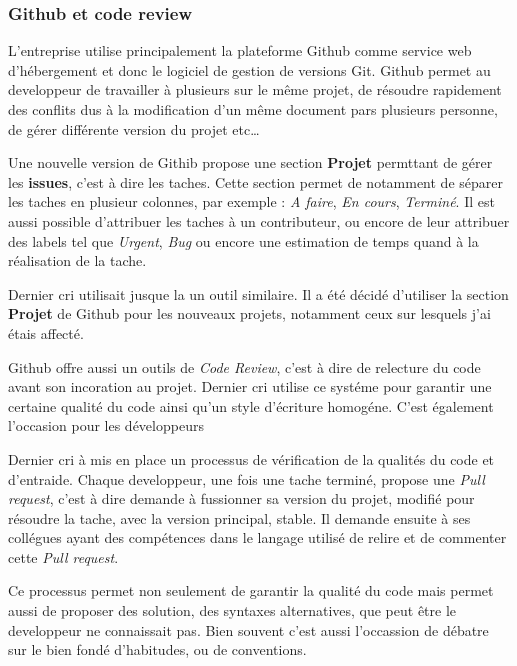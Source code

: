 \documentclass[12pt,a4paper]{article}
\begin{document}
  \subsubsection{Github et code review}\label{github-et-code-review}

  \bigskip

  L'entreprise utilise principalement la plateforme Github comme service
  web d'hébergement et donc le logiciel de gestion de versions Git. Github
  permet au developpeur de travailler à plusieurs sur le même projet, de
  résoudre rapidement des conflits dus à la modification d'un même
  document pars plusieurs personne, de gérer différente version du projet
  etc\ldots{}

  \bigskip

  Une nouvelle version de Githib propose une section \textbf{Projet}
  permttant de gérer les \textbf{issues}, c'est à dire les taches. Cette
  section permet de notamment de séparer les taches en plusieur colonnes,
  par exemple : \emph{A faire}, \emph{En cours}, \emph{Terminé}. Il est
  aussi possible d'attribuer les taches à un contributeur, ou encore de
  leur attribuer des labels tel que \emph{Urgent}, \emph{Bug} ou encore
  une estimation de temps quand à la réalisation de la tache.

  \bigskip

  Dernier cri utilisait jusque la un outil similaire. Il a été décidé
  d'utiliser la section \textbf{Projet} de Github pour les nouveaux
  projets, notamment ceux sur lesquels j'ai étais affecté.

  \bigskip

  Github offre aussi un outils de \emph{Code Review}, c'est à dire de
  relecture du code avant son incoration au projet. Dernier cri utilise ce
  systéme pour garantir une certaine qualité du code ainsi qu'un style
  d'écriture homogéne. C'est également l'occasion pour les développeurs

  \bigskip

  Dernier cri à mis en place un processus de vérification de la qualités
  du code et d'entraide. Chaque developpeur, une fois une tache terminé,
  propose une \emph{Pull request}, c'est à dire demande à fussionner sa
  version du projet, modifié pour résoudre la tache, avec la version
  principal, stable. Il demande ensuite à ses collégues ayant des
  compétences dans le langage utilisé de relire et de commenter cette
  \emph{Pull request}.

  \bigskip

  Ce processus permet non seulement de garantir la qualité du code mais
  permet aussi de proposer des solution, des syntaxes alternatives, que
  peut être le developpeur ne connaissait pas. Bien souvent c'est aussi
  l'occassion de débatre sur le bien fondé d'habitudes, ou de conventions.
\end{document}
